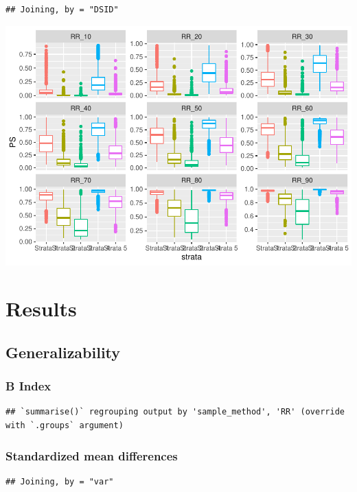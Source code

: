 \documentclass[
  english,
  man,floatsintext]{apa6}
\begin{document}
\begin{verbatim}
## Joining, by = "DSID"
\end{verbatim}

\includegraphics{5---Analysis_files/figure-latex/unnamed-chunk-15-2.pdf}

\hypertarget{results}{%
\section{Results}\label{results}}

\hypertarget{generalizability}{%
\subsection{Generalizability}\label{generalizability}}

\hypertarget{b-index}{%
\subsubsection{B Index}\label{b-index}}

\begin{verbatim}
## `summarise()` regrouping output by 'sample_method', 'RR' (override with `.groups` argument)
\end{verbatim}

\hypertarget{standardized-mean-differences}{%
\subsubsection{Standardized mean differences}\label{standardized-mean-differences}}

\begin{verbatim}
## Joining, by = "var"
\end{verbatim}
\end{document}
